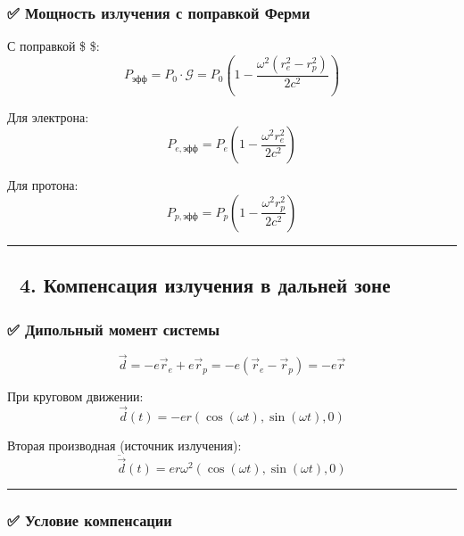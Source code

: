 \documentclass[11pt]{article}
\begin{document}
\subsubsection{✅ Мощность излучения с поправкой
Ферми}\label{ux43cux43eux449ux43dux43eux441ux442ux44c-ux438ux437ux43bux443ux447ux435ux43dux438ux44f-ux441-ux43fux43eux43fux440ux430ux432ux43aux43eux439-ux444ux435ux440ux43cux438}

С поправкой \$  \$: \[
P_{\text{эфф}} = P_0 \cdot \mathcal{G} = P_0 \left( 1 - \frac{\omega^2 (r_e^2 - r_p^2)}{2c^2} \right)
\]

Для электрона: \[
P_{e,\text{эфф}} = P_e \left( 1 - \frac{\omega^2 r_e^2}{2c^2} \right)
\]

Для протона: \[
P_{p,\text{эфф}} = P_p \left( 1 - \frac{\omega^2 r_p^2}{2c^2} \right)
\]

\begin{center}\rule{0.5\linewidth}{\linethickness}\end{center}

\subsection{🔹 4. Компенсация излучения в дальней
зоне}\label{ux43aux43eux43cux43fux435ux43dux441ux430ux446ux438ux44f-ux438ux437ux43bux443ux447ux435ux43dux438ux44f-ux432-ux434ux430ux43bux44cux43dux435ux439-ux437ux43eux43dux435}

\subsubsection{✅ Дипольный момент
системы}\label{ux434ux438ux43fux43eux43bux44cux43dux44bux439-ux43cux43eux43cux435ux43dux442-ux441ux438ux441ux442ux435ux43cux44b}

\[
\vec{d} = -e \vec{r}_e + e \vec{r}_p = -e (\vec{r}_e - \vec{r}_p) = -e \vec{r}
\]

При круговом движении: \[
\vec{d}(t) = -e r (\cos(\omega t), \sin(\omega t), 0)
\]

Вторая производная (источник излучения): \[
\ddot{\vec{d}}(t) = e r \omega^2 (\cos(\omega t), \sin(\omega t), 0)
\]

\begin{center}\rule{0.5\linewidth}{\linethickness}\end{center}

\subsubsection{✅ Условие
компенсации}\label{ux443ux441ux43bux43eux432ux438ux435-ux43aux43eux43cux43fux435ux43dux441ux430ux446ux438ux438}
\end{document}
